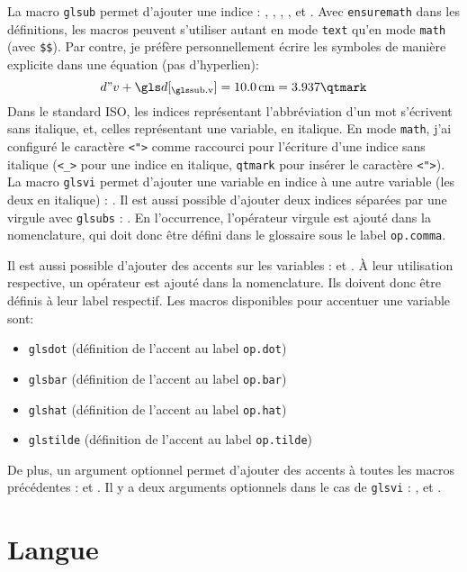 \documentclass[PhD,nohyperref,english,french]{ulthese}
\begin{document}
La macro \texttt{glsub} permet d'ajouter une indice : , , , ,  et . Avec \texttt{ensuremath} dans les définitions, les macros peuvent s'utiliser autant en mode \texttt{text} qu'en mode \texttt{math} (avec \texttt{\$\$}). Par contre, je préfère personnellement écrire les symboles de manière explicite dans une équation (pas d'hyperlien):
\begin{equation}
d"v + \glsub{d}{v} = \SI{10.0}{\centi\meter} = 3.937\qtmark
\end{equation}
Dans le standard ISO, les indices représentant l'abbréviation d'un mot s'écrivent sans italique, et, celles représentant une variable, en italique. En mode \texttt{math}, j'ai configuré le caractère \texttt{<">} comme raccourci pour l'écriture d'une indice sans italique (\texttt{<\_>} pour une indice en italique, \texttt{qtmark} pour insérer le caractère \texttt{<">}). La macro \texttt{glsvi} permet d'ajouter une variable en indice à une autre variable (les deux en italique) : . Il est aussi possible d'ajouter deux indices séparées par une virgule avec \texttt{glsubs} : . En l’occurrence, l'opérateur virgule est ajouté dans la nomenclature, qui doit donc être défini dans le glossaire sous le label \texttt{op.comma}.

Il est aussi possible d'ajouter des accents sur les variables :  et . À leur utilisation respective, un opérateur est ajouté dans la nomenclature. Ils doivent donc être définis à leur label respectif. Les macros disponibles pour accentuer une variable sont:
\begin{itemize} 
	\item \texttt{glsdot} (définition de l'accent au label \texttt{op.dot})
	\item \texttt{glsbar} (définition de l'accent au label \texttt{op.bar})
	\item \texttt{glshat} (définition de l'accent au label \texttt{op.hat})
	\item \texttt{glstilde} (définition de l'accent au label \texttt{op.tilde})
\end{itemize}
De plus, un argument optionnel permet d'ajouter des accents à toutes les macros précédentes :  et . Il y a deux arguments optionnels dans le cas de \texttt{glsvi} : ,  et .

\section{Langue}
\end{document}
